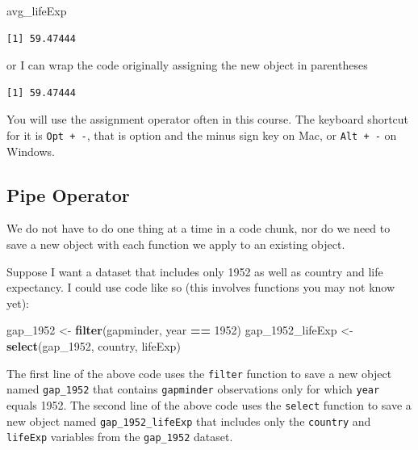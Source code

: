\documentclass[
]{book}
\makeatletter
\newenvironment{Shaded}{\begin{snugshade}}{\end{snugshade}}
\newcommand{\DecValTok}[1]{\textcolor[rgb]{0.06,0.06,0.06}{#1}}
\newcommand{\FunctionTok}[1]{\textcolor[rgb]{0.27,0.27,0.27}{\textbf{#1}}}
\newcommand{\NormalTok}[1]{#1}
\newcommand{\OtherTok}[1]{\textcolor[rgb]{0.37,0.37,0.37}{#1}}
\newcommand{\SpecialCharTok}[1]{\textcolor[rgb]{0.43,0.43,0.43}{\textbf{#1}}}
\newenvironment{kframe}{%
\medskip{}
\setlength{\fboxsep}{.8em}
 \def\at@end@of@kframe{}%
 \ifinner\ifhmode%
  \def\at@end@of@kframe{\end{minipage}}%
  \begin{minipage}{\columnwidth}%
 \fi\fi%
 \def\FrameCommand##1{\hskip\@totalleftmargin \hskip-\fboxsep
 \colorbox{shadecolor}{##1}\hskip-\fboxsep
     \hskip-\linewidth \hskip-\@totalleftmargin \hskip\columnwidth}%
 \MakeFramed {\advance\hsize-\width
   \@totalleftmargin\z@ \linewidth\hsize
   \@setminipage}}%
 {\par\unskip\endMakeFramed%
 \at@end@of@kframe}
\renewenvironment{Shaded}{\begin{kframe}}{\end{kframe}}
\makeatother
\begin{document}
\begin{Shaded}
\begin{Highlighting}[]
\NormalTok{avg\_lifeExp}
\end{Highlighting}
\end{Shaded}

\begin{verbatim}
[1] 59.47444
\end{verbatim}

or I can wrap the code originally assigning the new object in parentheses

\begin{Shaded}
\end{Shaded}

\begin{verbatim}
[1] 59.47444
\end{verbatim}

You will use the assignment operator often in this course. The keyboard shortcut for it is \texttt{Opt\ +\ -}, that is option and the minus sign key on Mac, or \texttt{Alt\ +\ -} on Windows.

\hypertarget{pipe-operator}{%
\subsection{Pipe Operator}\label{pipe-operator}}

We do not have to do one thing at a time in a code chunk, nor do we need to save a new object with each function we apply to an existing object.

Suppose I want a dataset that includes only 1952 as well as country and life expectancy. I could use code like so (this involves functions you may not know yet):

\begin{Shaded}
\begin{Highlighting}[]
\NormalTok{gap\_1952 }\OtherTok{\textless{}{-}} \FunctionTok{filter}\NormalTok{(gapminder, year }\SpecialCharTok{==} \DecValTok{1952}\NormalTok{)}
\NormalTok{gap\_1952\_lifeExp }\OtherTok{\textless{}{-}} \FunctionTok{select}\NormalTok{(gap\_1952, country, lifeExp)}
\end{Highlighting}
\end{Shaded}

The first line of the above code uses the \texttt{filter} function to save a new object named \texttt{gap\_1952} that contains \texttt{gapminder} observations only for which \texttt{year} equals 1952. The second line of the above code uses the \texttt{select} function to save a new object named \texttt{gap\_1952\_lifeExp} that includes only the \texttt{country} and \texttt{lifeExp} variables from the \texttt{gap\_1952} dataset.
\end{document}
